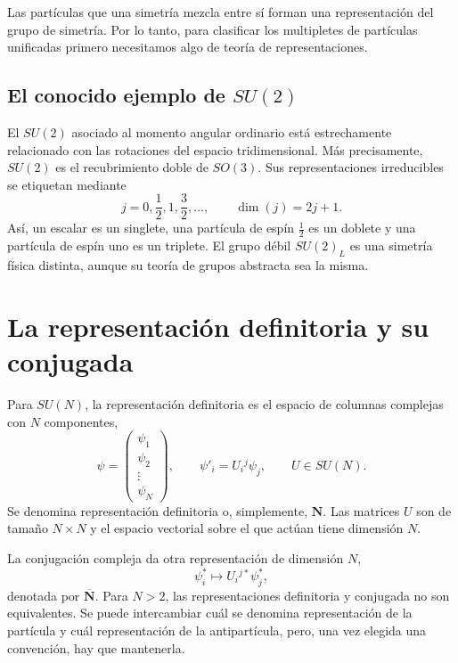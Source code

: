 Las partículas que una simetría mezcla entre sí forman una representación del grupo de simetría. Por lo tanto, para clasificar los multipletes de partículas unificadas primero necesitamos algo de teoría de representaciones.

\subsection{El conocido ejemplo de \texorpdfstring{\(SU(2)\)}{SU(2)}}

El \(SU(2)\) asociado al momento angular ordinario está estrechamente relacionado con las rotaciones del espacio tridimensional. Más precisamente, \(SU(2)\) es el recubrimiento doble de \(SO(3)\). Sus representaciones irreducibles se etiquetan mediante
\begin{equation}
j=0,\frac12,1,\frac32,\ldots,
\qquad
\dim(j)=2j+1.
\label{eq:l10-su2-spins}
\end{equation}
Así, un escalar es un singlete, una partícula de espín \(\tfrac12\) es un doblete y una partícula de espín uno es un triplete. El grupo débil \(SU(2)_L\) es una simetría física distinta, aunque su teoría de grupos abstracta sea la misma.

\section{La representación definitoria y su conjugada}

Para \(SU(N)\), la representación definitoria es el espacio de columnas complejas con \(N\) componentes,
\begin{equation}
\psi=
\begin{pmatrix}
\psi_1\\
\psi_2\\
\vdots\\
\psi_N
\end{pmatrix},
\qquad
\psi'_i=U_i{}^j\psi_j,
\qquad
U\in SU(N).
\label{eq:l10-defining}
\end{equation}
Se denomina representación definitoria o, simplemente, \(\mathbf N\). Las matrices \(U\) son de tamaño \(N\times N\) y el espacio vectorial sobre el que actúan tiene dimensión \(N\).

La conjugación compleja da otra representación de dimensión \(N\),
\begin{equation}
\psi_i^*\longmapsto U_i{}^{j*}\psi_j^*,
\label{eq:l10-conjugate}
\end{equation}
denotada por \(\overline{\mathbf N}\). Para \(N>2\), las representaciones definitoria y conjugada no son equivalentes. Se puede intercambiar cuál se denomina representación de la partícula y cuál representación de la antipartícula, pero, una vez elegida una convención, hay que mantenerla.

